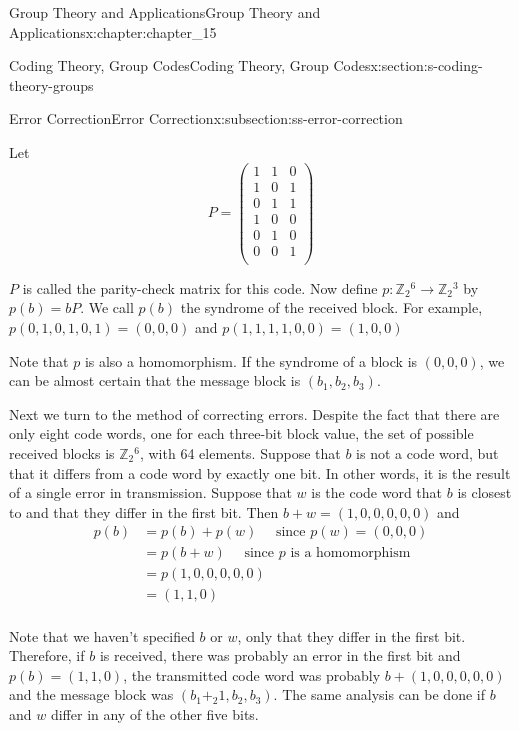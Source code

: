 \documentclass[oneside,10pt,]{book}
\numberwithin{equation}{section}
\begin{document}
\begin{chapterptx}{Group Theory and Applications}{}{Group Theory and Applications}{}{}{x:chapter:chapter_15}
\begin{sectionptx}{Coding Theory, Group Codes}{}{Coding Theory, Group Codes}{}{}{x:section:s-coding-theory-groups}
\begin{subsectionptx}{Error Correction}{}{Error Correction}{}{}{x:subsection:ss-error-correction}
\par
Let%
\begin{equation*}
P=\left(
\begin{array}{ccc}
1 & 1 & 0 \\
1 & 0 & 1 \\
0 & 1 & 1 \\
1 & 0 & 0 \\
0 & 1 & 0 \\
0 & 0 & 1 \\
\end{array}
\right)
\end{equation*}
%
\par
\(P\) is called the parity-check matrix for this code. Now define \(p:\mathbb{Z}_2{}^6 \to \mathbb{Z}_2{}^3\) by \(p(b) = b P\).  We call \(p(b)\) the syndrome of the received block. For example, \(p(0,1,0,1,0,1)=(0,0,0)\)  and   \(p(1,1,1,1,0,0)=(1,0,0)\)%
\par
Note that \(p\) is also a homomorphism. If the syndrome of a block is \((0, 0, 0)\), we can be almost certain that the message block is \(\left(b_1, b_2, b_3\right)\).%
\par
Next we turn to the method of correcting errors. Despite the fact that there are only eight code words, one for each three-bit block value, the set of possible received blocks is \(\mathbb{Z}_2{}^6\), with 64 elements. Suppose that \(b\) is not a code word, but that it differs from a code word by exactly one bit. In other words, it is the result of a single error in transmission. Suppose that \(w\) is the code word that \(b\) is closest to and that they differ in the first bit. Then \(b + w = (1, 0, 0, 0, 0, 0)\) and%
\begin{equation*}
\begin{split}
p(b) & = p(b) + p(w)\quad \textrm{  since }p(w) = (0, 0, 0)\\
&=p(b+w)\quad\textrm{ since }p \textrm{ is a homomorphism}\\
& =p(1,0,0,0,0,0)\\
& =(1,1,0)\\
\end{split}
\end{equation*}
%
\par
Note that we haven't specified \(b\) or \(w\), only that they differ in the first bit. Therefore, if \(b\) is received, there was probably an error in the first bit and \(p(b)
= (1, 1, 0)\), the transmitted code word was probably \(b + (1, 0, 0, 0, 0, 0)\) and the message block was \(\left(b_1+_2 1, b_2, b_3\right)\). The same analysis can be done if \(b\) and \(w\) differ in any of the other five bits.%

\end{subsectionptx}
\end{sectionptx}
\end{chapterptx}
\end{document}
